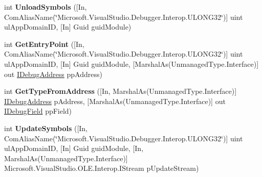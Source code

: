\begin{DoxyCompactItemize}
\item 
\hypertarget{interface_microsoft_1_1_visual_studio_1_1_debugger_1_1_interop_e_e_1_1_i_debug_com_plus_symbol_provider_a4cfa1a2239b36b4fa8508443bc32d0c4}{int {\bfseries Unload\+Symbols} (\mbox{[}In, Com\+Alias\+Name(\char`\"{}Microsoft.\+Visual\+Studio.\+Debugger.\+Interop.\+U\+L\+O\+N\+G32\char`\"{})\mbox{]} uint ul\+App\+Domain\+I\+D, \mbox{[}In\mbox{]} Guid guid\+Module)}\label{interface_microsoft_1_1_visual_studio_1_1_debugger_1_1_interop_e_e_1_1_i_debug_com_plus_symbol_provider_a4cfa1a2239b36b4fa8508443bc32d0c4}

\item 
\hypertarget{interface_microsoft_1_1_visual_studio_1_1_debugger_1_1_interop_e_e_1_1_i_debug_com_plus_symbol_provider_a980e0d459f1b67ec9c6dbb60b5db5dab}{int {\bfseries Get\+Entry\+Point} (\mbox{[}In, Com\+Alias\+Name(\char`\"{}Microsoft.\+Visual\+Studio.\+Debugger.\+Interop.\+U\+L\+O\+N\+G32\char`\"{})\mbox{]} uint ul\+App\+Domain\+I\+D, \mbox{[}In\mbox{]} Guid guid\+Module, \mbox{[}Marshal\+As(Unmanaged\+Type.\+Interface)\mbox{]} out \hyperlink{interface_microsoft_1_1_visual_studio_1_1_debugger_1_1_interop_e_e_1_1_i_debug_address}{I\+Debug\+Address} pp\+Address)}\label{interface_microsoft_1_1_visual_studio_1_1_debugger_1_1_interop_e_e_1_1_i_debug_com_plus_symbol_provider_a980e0d459f1b67ec9c6dbb60b5db5dab}

\item 
\hypertarget{interface_microsoft_1_1_visual_studio_1_1_debugger_1_1_interop_e_e_1_1_i_debug_com_plus_symbol_provider_a3de4c6a09af72d4f43ed164a7fd3c9fa}{int {\bfseries Get\+Type\+From\+Address} (\mbox{[}In, Marshal\+As(Unmanaged\+Type.\+Interface)\mbox{]} \hyperlink{interface_microsoft_1_1_visual_studio_1_1_debugger_1_1_interop_e_e_1_1_i_debug_address}{I\+Debug\+Address} p\+Address, \mbox{[}Marshal\+As(Unmanaged\+Type.\+Interface)\mbox{]} out \hyperlink{interface_microsoft_1_1_visual_studio_1_1_debugger_1_1_interop_e_e_1_1_i_debug_field}{I\+Debug\+Field} pp\+Field)}\label{interface_microsoft_1_1_visual_studio_1_1_debugger_1_1_interop_e_e_1_1_i_debug_com_plus_symbol_provider_a3de4c6a09af72d4f43ed164a7fd3c9fa}

\item 
\hypertarget{interface_microsoft_1_1_visual_studio_1_1_debugger_1_1_interop_e_e_1_1_i_debug_com_plus_symbol_provider_a7dc42390b803ddb97406d8f2c51aa457}{int {\bfseries Update\+Symbols} (\mbox{[}In, Com\+Alias\+Name(\char`\"{}Microsoft.\+Visual\+Studio.\+Debugger.\+Interop.\+U\+L\+O\+N\+G32\char`\"{})\mbox{]} uint ul\+App\+Domain\+I\+D, \mbox{[}In\mbox{]} Guid guid\+Module, \mbox{[}In, Marshal\+As(Unmanaged\+Type.\+Interface)\mbox{]} Microsoft.\+Visual\+Studio.\+O\+L\+E.\+Interop.\+I\+Stream p\+Update\+Stream)}\label{interface_microsoft_1_1_visual_studio_1_1_debugger_1_1_interop_e_e_1_1_i_debug_com_plus_symbol_provider_a7dc42390b803ddb97406d8f2c51aa457}


\end{DoxyCompactItemize}
